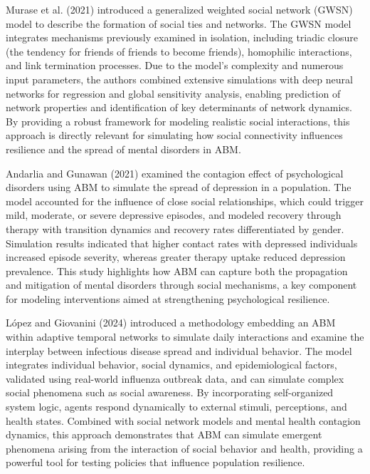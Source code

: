 \documentclass[
  letterpaper,
  DIV=11,
  numbers=noendperiod]{scrartcl}
\begin{document}
Murase et al. (2021) introduced a generalized weighted social network
(GWSN) model to describe the formation of social ties and networks. The
GWSN model integrates mechanisms previously examined in isolation,
including triadic closure (the tendency for friends of friends to become
friends), homophilic interactions, and link termination processes. Due
to the model's complexity and numerous input parameters, the authors
combined extensive simulations with deep neural networks for regression
and global sensitivity analysis, enabling prediction of network
properties and identification of key determinants of network dynamics.
By providing a robust framework for modeling realistic social
interactions, this approach is directly relevant for simulating how
social connectivity influences resilience and the spread of mental
disorders in ABM.

Andarlia and Gunawan (2021) examined the contagion effect of
psychological disorders using ABM to simulate the spread of depression
in a population. The model accounted for the influence of close social
relationships, which could trigger mild, moderate, or severe depressive
episodes, and modeled recovery through therapy with transition dynamics
and recovery rates differentiated by gender. Simulation results
indicated that higher contact rates with depressed individuals increased
episode severity, whereas greater therapy uptake reduced depression
prevalence. This study highlights how ABM can capture both the
propagation and mitigation of mental disorders through social
mechanisms, a key component for modeling interventions aimed at
strengthening psychological resilience.

López and Giovanini (2024) introduced a methodology embedding an ABM
within adaptive temporal networks to simulate daily interactions and
examine the interplay between infectious disease spread and individual
behavior. The model integrates individual behavior, social dynamics, and
epidemiological factors, validated using real-world influenza outbreak
data, and can simulate complex social phenomena such as social
awareness. By incorporating self-organized system logic, agents respond
dynamically to external stimuli, perceptions, and health states.
Combined with social network models and mental health contagion
dynamics, this approach demonstrates that ABM can simulate emergent
phenomena arising from the interaction of social behavior and health,
providing a powerful tool for testing policies that influence population
resilience.
\end{document}
